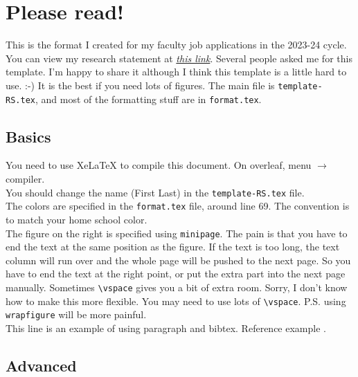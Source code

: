 


\setlength{\columnsep}{15pt}%
\setlength{\intextsep}{0pt plus 0pt minus 0pt}

\begin{minipage}[t]{504pt}
\begin{minipage}[t]{350pt}
\setlength{\parindent}{\myindent}
\setlength{\parskip}{\myparskip}

 \vspace*{-10pt}

\section{Please read!}

This is the format I created for my faculty job applications in the 2023-24 cycle.  You can view my research statement at \href{https://www.fmyang.com/files/statements/Fumeng_Yang-RS_2023.pdf}{\textit{this link}}. Several people asked me for this template. 
I'm happy to share it although I think this template is a little hard to use. :-) It is the best if you need lots of figures.
The main file is \verb|template-RS.tex|, and most of the formatting stuff are in \verb|format.tex|.  

\subsection{Basics}
You need to use XeLaTeX to compile this document. On overleaf, menu $\rightarrow$ compiler. \\
You should change the name (First Last) in the \verb|template-RS.tex| file. \\
The colors are specified in the \verb|format.tex| file, around line 69. The convention is to match your home school color. \\
The figure on the right is specified using  \verb|minipage|. The pain is that you have to end the text at the same position as the figure. If the text is too long, the text column will run over and the whole page will be pushed to the next page. So you have to end the text at the right point, or put the extra part into the next page manually. Sometimes \verb|\vspace| gives you a bit of extra room. Sorry, I don't know how to make this more flexible. You may need to use lots of \verb|\vspace|. P.S. using \verb|wrapfigure| will be more painful. \\
This line is an example of using paragraph and bibtex. Reference example \cite{examplepaper}.

\subsection{Advanced}

\end{minipage}
\end{minipage}
